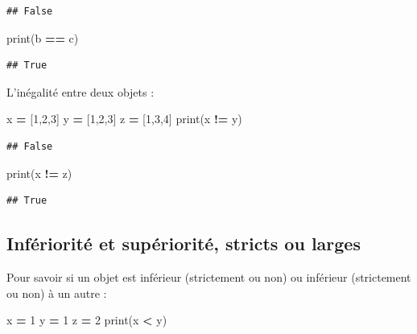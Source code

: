 \documentclass[12pt,]{book}
\newenvironment{Shaded}{\begin{snugshade}}{\end{snugshade}}
\newcommand{\DecValTok}[1]{\textcolor[rgb]{0.00,0.00,0.81}{#1}}
\newcommand{\OperatorTok}[1]{\textcolor[rgb]{0.81,0.36,0.00}{\textbf{#1}}}
\newcommand{\BuiltInTok}[1]{#1}
\newcommand{\NormalTok}[1]{#1}
\numberwithin{equation}{section}
\numberwithin{countremarque}{section}
\begin{document}
\begin{lstlisting}
## False
\end{lstlisting}

\begin{Shaded}
\begin{Highlighting}[]
\BuiltInTok{print}\NormalTok{(b }\OperatorTok{==}\NormalTok{ c)}
\end{Highlighting}
\end{Shaded}

\begin{lstlisting}
## True
\end{lstlisting}

L'inégalité entre deux objets :

\begin{Shaded}
\begin{Highlighting}[]
\NormalTok{x }\OperatorTok{=}\NormalTok{ [}\DecValTok{1}\NormalTok{,}\DecValTok{2}\NormalTok{,}\DecValTok{3}\NormalTok{]}
\NormalTok{y }\OperatorTok{=}\NormalTok{ [}\DecValTok{1}\NormalTok{,}\DecValTok{2}\NormalTok{,}\DecValTok{3}\NormalTok{]}
\NormalTok{z }\OperatorTok{=}\NormalTok{ [}\DecValTok{1}\NormalTok{,}\DecValTok{3}\NormalTok{,}\DecValTok{4}\NormalTok{]}
\BuiltInTok{print}\NormalTok{(x }\OperatorTok{!=}\NormalTok{ y)}
\end{Highlighting}
\end{Shaded}

\begin{lstlisting}
## False
\end{lstlisting}

\begin{Shaded}
\begin{Highlighting}[]
\BuiltInTok{print}\NormalTok{(x }\OperatorTok{!=}\NormalTok{ z)}
\end{Highlighting}
\end{Shaded}

\begin{lstlisting}
## True
\end{lstlisting}

\subsection{Infériorité et supériorité, stricts ou
larges}\label{inferiorite-et-superiorite-stricts-ou-larges}

Pour savoir si un objet est inférieur (strictement ou non) ou inférieur
(strictement ou non) à un autre :

\begin{Shaded}
\begin{Highlighting}[]
\NormalTok{x }\OperatorTok{=} \DecValTok{1}
\NormalTok{y }\OperatorTok{=} \DecValTok{1}
\NormalTok{z }\OperatorTok{=} \DecValTok{2}
\BuiltInTok{print}\NormalTok{(x }\OperatorTok{<}\NormalTok{ y)}
\end{Highlighting}
\end{Shaded}
\end{document}
